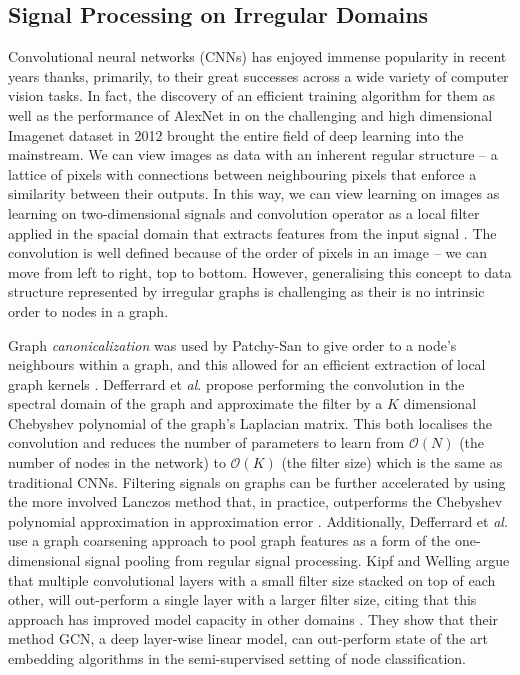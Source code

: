 \documentclass{IEEEtran}
\begin{document}
	\subsection{Signal Processing on Irregular Domains}
	Convolutional neural networks (CNNs) has enjoyed immense popularity in recent years thanks, primarily, to their great successes across a wide variety of computer vision tasks. 
	In fact, the discovery of an efficient training algorithm for them as well as the performance of AlexNet in on the challenging and high dimensional Imagenet dataset in 2012 \cite{krizhevsky2012imagenet} brought the entire field of deep learning into the mainstream.
	We can view images as data with an inherent regular structure -- a lattice of pixels with connections between neighbouring pixels that enforce a similarity between their outputs. 
	In this way, we can view learning on images as learning on two-dimensional signals and convolution operator as a local filter applied in the spacial domain that extracts features from the input signal \cite{defferrard2016convolutional}.
	The convolution is well defined because of the order of pixels in an image -- we can move from left to right, top to bottom.
	However, generalising this concept to data structure represented by irregular graphs is challenging as their is no intrinsic order to nodes in a graph.
	
	Graph \textit{canonicalization} was used by Patchy-San to give order to a node's neighbours within a graph, and this allowed for an efficient extraction of local graph kernels \cite{niepert2016learning}.
	Defferrard et \textit{al}. \cite{defferrard2016convolutional} propose performing the convolution in the spectral domain of the graph and approximate the filter by a $K$ dimensional Chebyshev polynomial of the graph's Laplacian matrix. 
	This both localises the convolution and reduces the number of parameters to learn from $\mathcal{O}(N)$ (the number of nodes in the network) to $\mathcal{O}(K)$ (the filter size) which is the same as traditional CNNs. 
	Filtering signals on graphs can be further accelerated by using the more involved Lanczos method that, in practice, outperforms the Chebyshev polynomial approximation in approximation error \cite{susnjara2015accelerated}.
	Additionally, Defferrard et \textit{al}. use a graph coarsening approach to pool graph features as a form of the one-dimensional signal pooling from regular signal processing. 
	Kipf and Welling \cite{kipf2016semi} argue that multiple convolutional layers with a small filter size stacked on top of each other, will out-perform a single layer with a larger filter size, citing that this approach has improved model capacity in other domains \cite{he2016deep}. They show that their method GCN, a deep layer-wise linear model, can out-perform state of the art embedding algorithms in the semi-supervised setting of node classification.
	
\end{document}
